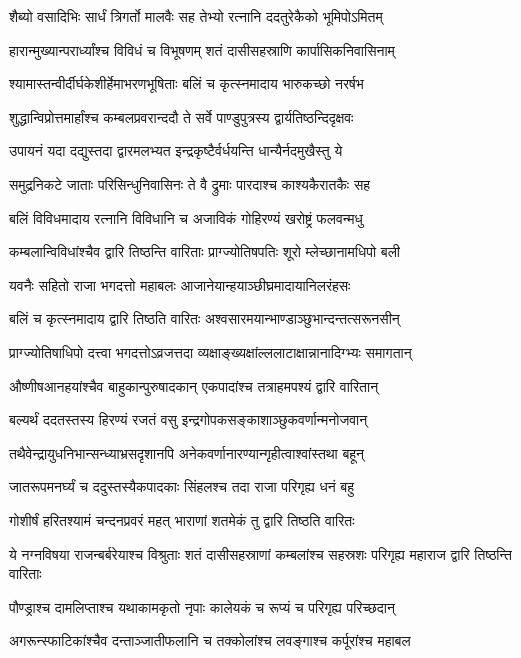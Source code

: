 \twolineshloka
{शैब्यो वसादिभिः सार्धं त्रिगर्तो मालवैः सह}
{तेभ्यो रत्नानि ददतुरेकैको भूमिपोऽमितम्}


\twolineshloka
{हारान्मुख्यान्परार्ध्यांश्च विविधं च विभूषणम्}
{शतं दासीसहस्राणि कार्पासिकनिवासिनाम्}


\twolineshloka
{श्यामास्तन्वीर्दीर्घकेशीर्हेमाभरणभूषिताः}
{बलिं च कृत्स्नमादाय भारुकच्छो नरर्षभ}


\twolineshloka
{शुद्धान्विप्रोत्तमार्हांश्च कम्बलप्रवरान्ददौ}
{ते सर्वे पाण्डुपुत्रस्य द्वार्यतिष्ठन्दिदृक्षवः}


\twolineshloka
{उपायनं यदा दद्युस्तदा द्वारमलभ्यत}
{इन्द्रकृष्टैर्वर्धयन्ति धान्यैर्नदमुखैस्तु ये}


\twolineshloka
{समुद्रनिकटे जाताः परिसिन्धुनिवासिनः}
{ते वै द्रुमाः पारदाश्च काश्यकैरातकैः सह}


\twolineshloka
{बलिं विविधमादाय रत्नानि विविधानि च}
{अजाविकं गोहिरण्यं खरोष्ट्रं फलवन्मधु}


\twolineshloka
{कम्बलान्विविधांश्चैव द्वारि तिष्ठन्ति वारिताः}
{प्राग्ज्योतिषपतिः शूरो म्लेच्छानामधिपो बली}


\twolineshloka
{यवनैः सहितो राजा भगदत्तो महाबलः}
{आजानेयान्हयाञ्छीघ्रमादायानिलरंहसः}


\twolineshloka
{बलिं च कृत्स्नमादाय द्वारि तिष्ठति वारितः}
{अश्वसारमयान्भाण्डाञ्छुभान्दन्तत्सरूनसीन्}


\twolineshloka
{प्राग्ज्योतिषाधिपो दत्त्वा भगदत्तोऽव्रजत्तदा}
{व्यक्षाङ्ख्यक्षांल्ललाटाक्षान्नानादिग्भ्यः समागतान्}


\twolineshloka
{औष्णीषआनहयांश्चैव बाहुकान्पुरुषादकान्}
{एकपादांश्च तत्राहमपश्यं द्वारि वारितान्}


\twolineshloka
{बल्यर्थं ददतस्तस्य हिरण्यं रजतं वसु}
{इन्द्रगोपकसङ्काशाञ्छुकवर्णान्मनोजवान्}


\twolineshloka
{तथैवेन्द्रायुधनिभान्सन्ध्याभ्रसदृशानपि}
{अनेकवर्णानारण्यान्गृहीत्वाश्वांस्तथा बहून्}


\twolineshloka
{जातरूपमनर्घ्यं च ददुस्तस्यैकपादकाः}
{सिंहलश्च तदा राजा परिगृह्य धनं बहु}


\twolineshloka
{गोशीर्षं हरितश्यामं चन्दनप्रवरं महत्}
{भाराणां शतमेकं तु द्वारि तिष्ठति वारितः}


\threelineshloka
{ये नग्नविषया राजन्बर्बरेयाश्च विश्रुताः}
{शतं दासीसहस्राणां कम्बलांश्च सहस्रशः}
{परिगृह्य महाराज द्वारि तिष्ठन्ति वारिताः}


\twolineshloka
{पौण्ड्राश्च दामलिप्ताश्च यथाकामकृतो नृपाः}
{कालेयकं च रूप्यं च परिगृह्य परिच्छदान्}


\twolineshloka
{अगरून्स्फाटिकांश्चैव दन्ताञ्जातीफलानि च}
{तक्कोलांश्च लवङ्गाश्च कर्पूरांश्च महाबल}


